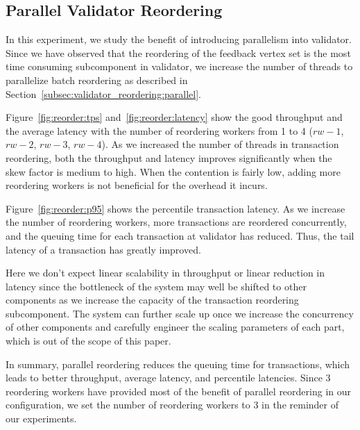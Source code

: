 \subsection{Parallel Validator Reordering}
In this experiment, we study the benefit of introducing parallelism into validator. Since we have observed that the reordering of the feedback vertex set is the most time consuming subcomponent in validator, we increase the number of threads to parallelize batch reordering as described in Section~\ref{subsec:validator_reordering:parallel}. 

Figure~\ref{fig:reorder:tps} and~\ref{fig:reorder:latency} show the good throughput and the average latency with the number of reordering workers from 1 to 4 ($rw-1$, $rw-2$, $rw-3$, $rw-4$). As we increased the number of threads in transaction reordering, both the throughput and latency improves significantly when the skew factor is medium to high. When the contention is fairly low, adding more reordering workers is not beneficial for the overhead it incurs.

Figure~\ref{fig:reorder:p95} shows the percentile transaction latency. As we increase the number of reordering workers, more transactions are reordered concurrently, and the queuing time for each transaction at validator has reduced. Thus, the tail latency of a transaction has greatly improved. 

Here we don't expect linear scalability in throughput or linear reduction in latency since the bottleneck of the system may well be shifted to other components as we increase the capacity of the transaction reordering subcomponent. The system can further scale up once we increase the concurrency of other components and carefully engineer the scaling parameters of each part, which is out of the scope of this paper.

In summary, parallel reordering reduces the queuing time for transactions, which leads to better throughput, average latency, and percentile latencies. Since 3 reordering workers have provided most of the benefit of parallel reordering in our configuration, we set the number of reordering workers to 3 in the reminder of our experiments.
